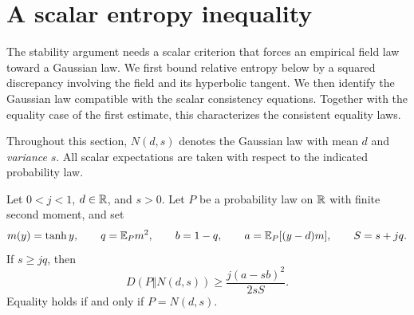 \section{A scalar entropy inequality}
\label{sec:entropy}

The stability argument needs a scalar criterion that forces an
empirical field law toward a Gaussian law.  We first bound relative
entropy below by a squared discrepancy involving the field and its
hyperbolic tangent.  We then identify the Gaussian law compatible
with the scalar consistency equations.  Together with the equality
case of the first estimate, this characterizes the consistent
equality laws.

Throughout this section, $N(d,s)$ denotes the Gaussian law with mean
$d$ and \emph{variance} $s$.  All scalar expectations are taken with
respect to the indicated probability law.

\begin{lemma}
\label{lem:scalar-entropy}
Let $0<j<1$, $d\in\mathbb R$, and $s>0$.  Let $P$ be a probability law on $\mathbb R$
with finite second moment, and set
\[
 m(y)=\tanh y,\qquad q=\mathbb E_P m^2,\qquad b=1-q,\qquad
 a=\mathbb E_P[(y-d)m],\qquad S=s+jq.
\]
If $s\ge jq$, then
\begin{equation}
 D(P\Vert N(d,s))\ge \frac{j(a-sb)^2}{2sS}.
 \label{eq:scalar-entropy}
\end{equation}
Equality holds if and only if $P=N(d,s)$.
\end{lemma}

